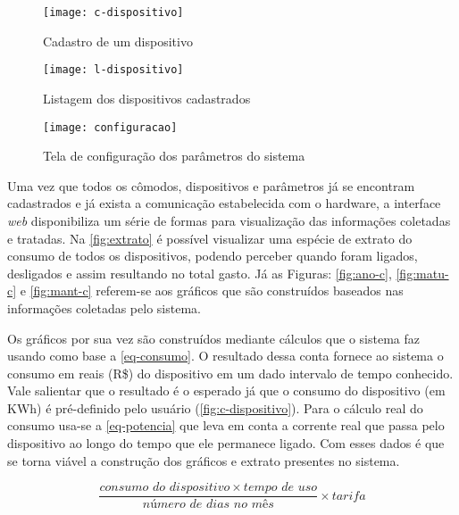 \begin{figure}[h!]
	\texttt{[image: c-dispositivo]}
	\centering
	\caption[Cadastro de um dispositivo]{Cadastro de um dispositivo}
	\label{fig:c-dispositivo} 
\end{figure}
\FloatBarrier

\begin{figure}[h!]
	\texttt{[image: l-dispositivo]}
	\centering
	\caption[Listagem dos dispositivos cadastrados]{Listagem dos dispositivos cadastrados}
	\label{fig:l-dispositivo} 
\end{figure}
\FloatBarrier

\begin{figure}[h!]
	\texttt{[image: configuracao]}
	\centering
	\caption[Tela de configuração dos parâmetros do sistema]{Tela de configuração dos parâmetros do sistema}
	\label{fig:configuracao-ft} 
\end{figure}
\FloatBarrier

Uma vez que todos os cômodos, dispositivos e parâmetros já se encontram cadastrados e já exista a comunicação estabelecida com o hardware, a interface
\textit{web} disponibiliza um série de formas para visualização das informações coletadas e tratadas. Na \autoref{fig:extrato} é possível visualizar
uma espécie de extrato do consumo de todos os dispositivos, podendo perceber quando foram ligados, desligados e assim resultando no total gasto.
Já as Figuras: \ref{fig:ano-c}, \ref{fig:matu-c} e \ref{fig:mant-c} referem-se aos gráficos que são construídos baseados nas informações coletadas pelo sistema.

Os gráficos por sua vez são construídos mediante cálculos que o sistema faz usando como base a \autoref{eq-consumo}. O resultado dessa conta
fornece ao sistema o consumo em reais (R\$) do dispositivo em um dado intervalo de tempo conhecido. Vale salientar que o resultado é o esperado já que o consumo
do dispositivo (em KWh) é pré-definido pelo usuário (\autoref{fig:c-dispositivo}). Para o cálculo real do consumo usa-se a \autoref{eq-potencia} que leva em conta a corrente real que passa
pelo dispositivo ao longo do tempo que ele permanece ligado. Com esses dados é que se torna viável a construção dos gráficos e extrato presentes no sistema.

\begin{equation} \label{eq-consumo}
	\frac{consumo \, \, do \, \, dispositivo \times tempo \, \, de \, \, uso}{número \, \, de \, \, dias \, \, no \, \, mês} \times tarifa
\end{equation}

